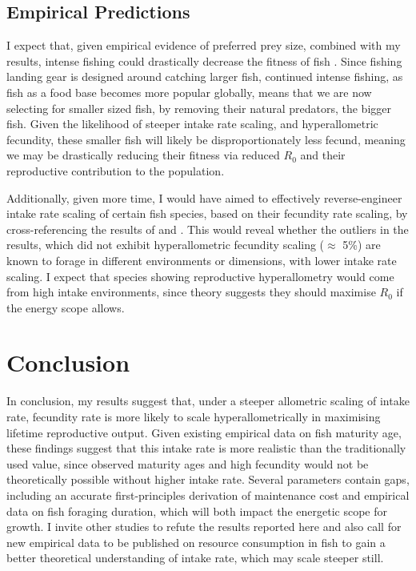 \documentclass[a4paper]{article} %
\begin{document}
\subsection{Empirical Predictions}
I expect that, given empirical evidence of preferred prey size, combined with my results, intense fishing could drastically decrease the fitness of fish \autocite{Brose2006, Barnes2010, VanGemert2019}. Since fishing landing gear is designed around catching larger fish, continued intense fishing, as fish as a food base becomes more popular globally, means that we are now selecting for smaller sized fish, by removing their natural predators, the bigger fish. Given the likelihood of steeper intake rate scaling, and hyperallometric fecundity, these smaller fish will likely be disproportionately less fecund, meaning we may be drastically reducing their fitness via reduced $R_0$ and their reproductive contribution to the population.

Additionally, given more time, I would have aimed to effectively reverse-engineer intake rate scaling of certain fish species, based on their fecundity rate scaling, by cross-referencing the results of \textcite{Pawar2012} and \textcite{Barneche2018-reproductive_output}. This would reveal whether the outliers in the \textcite{Barneche2018-reproductive_output} results, which did not exhibit hyperallometric fecundity scaling ($\approx$ 5\%) are known to forage in different environments or dimensions, with lower intake rate scaling. I expect that species showing reproductive hyperallometry would come from high intake environments, since theory suggests they should maximise $R_0$ if the energy scope allows.
\section{Conclusion}\thispagestyle{plain}
In conclusion, my results suggest that, under a steeper allometric scaling of intake rate, fecundity rate is more likely to scale hyperallometrically in maximising lifetime reproductive output. Given existing empirical data on fish maturity age, these findings suggest that this intake rate is more realistic than the traditionally used value, since observed maturity ages and high fecundity would not be theoretically possible without higher intake rate. Several parameters contain gaps, including an accurate first-principles derivation of maintenance cost and empirical data on fish foraging duration, which will both impact the energetic scope for growth. I invite other studies to refute the results reported here and also call for new empirical data to be published on resource consumption in fish to gain a better theoretical understanding of intake rate, which may scale steeper still.

\newpage\let\mkbibnamefamily\textsc\printbibliography[title=References]\thispagestyle{plain} %

% 
\end{document}
